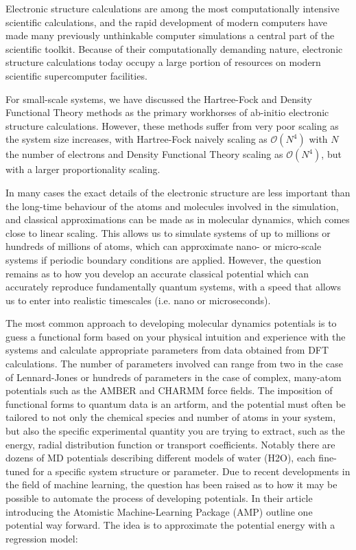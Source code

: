 Electronic structure calculations are among the most computationally
intensive scientific calculations, and the rapid development
of modern computers have made many previously unthinkable
computer simulations a central part of the scientific toolkit.
Because of their computationally demanding nature, electronic
structure calculations today occupy a large portion of resources
on modern scientific supercomputer facilities.
\par
For small-scale systems, we have discussed the Hartree-Fock
and Density Functional Theory methods as the primary workhorses
of ab-initio
electronic structure calculations. However, these methods suffer
from very poor scaling as the system size increases, with Hartree-Fock
naively scaling as $\mathcal{O}(N^4)$ with $N$ the number of electrons
and Density Functional Theory scaling as $\mathcal{O}(N^4)$,
but with a larger proportionality scaling.
\par
In many cases the exact details of the electronic structure
are less important than the long-time behaviour of the atoms
and molecules involved in the simulation, and classical approximations
can be made as in molecular dynamics, which comes close
to linear scaling. This allows us to simulate systems
of up to millions or hundreds of millions of atoms,
which can approximate nano- or micro-scale systems if
periodic boundary conditions are applied.
However, the question remains as to how you develop an
accurate classical potential which can accurately reproduce
fundamentally quantum systems, with a speed that allows
us to enter into realistic timescales (i.e. nano or microseconds).
\par
The most common approach to developing molecular dynamics potentials
is to guess a functional form based on your physical intuition
and experience with the systems and calculate appropriate parameters
from data obtained from DFT calculations.
The number of parameters involved can range from two in the case
of Lennard-Jones or hundreds of parameters in the case
of complex, many-atom potentials such as the AMBER and CHARMM
force fields. The imposition of functional forms to quantum data
is an artform, and the potential must often be tailored to not
only the chemical species and number of atoms in your system,
but also the specific experimental quantity you are trying to extract,
such as the energy, radial distribution function or transport
coefficients. Notably there are dozens of MD potentials
describing different models of water (H2O), each fine-tuned
for a specific system structure or parameter.
\newline
\newline
Due to recent developments in the field of machine learning,
the question has been raised as to how it may be possible to
automate the process of developing potentials.
In their article introducing the Atomistic Machine-Learning Package
(AMP) \parencite[Khorshidi, Alireza and Peterson, Andrew A.]
{khorshidi2016amp} outline one potential way forward.
The idea is to approximate the potential energy
with a regression model:

